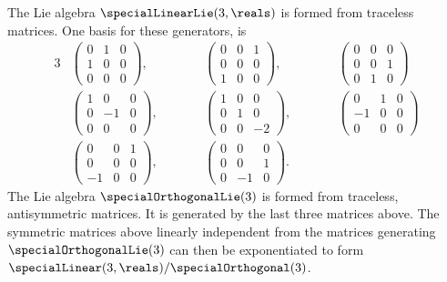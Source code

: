 \documentclass[fleqn]{NotesClass}
\begin{document}
\begin{exm}{}{}
        The Lie algebra \(\specialLinearLie(3, \reals)\) is formed from traceless matrices.
        One basis for these generators, is
        \begin{alignat}{3}
            &
            \begin{pmatrix}
                0 & 1 & 0\\
                1 & 0 & 0\\
                0 & 0 & 0
            \end{pmatrix}
            , \qquad &&
            \begin{pmatrix}
                0 & 0 & 1\\
                0 & 0 & 0\\
                1 & 0 & 0
            \end{pmatrix}
            , \qquad && 
            \begin{pmatrix}
                0 & 0 & 0\\
                0 & 0 & 1\\
                0 & 1 & 0
            \end{pmatrix}
            \\
            &
            \begin{pmatrix}
                1 & 0 & 0\\
                0 & -1 & 0\\
                0 & 0 & 0
            \end{pmatrix}
            , \qquad &&
            \begin{pmatrix}
                1 & 0 & 0\\
                0 & 1 & 0\\
                0 & 0 & -2
            \end{pmatrix}
            , \qquad &&
            \begin{pmatrix}
                0 & 1 & 0\\
                -1 & 0 & 0\\
                0 & 0 & 0
            \end{pmatrix}
            \\
            &
            \begin{pmatrix}
                0 & 0 & 1\\
                0 & 0 & 0\\
                -1 & 0 & 0
            \end{pmatrix}
            , \qquad &&
            \begin{pmatrix}
                0 & 0 & 0\\
                0 & 0 & 1\\
                0 & -1 & 0
            \end{pmatrix}
            .
        \end{alignat}
        The Lie algebra \(\specialOrthogonalLie(3)\) is formed from traceless, antisymmetric matrices.
        It is generated by the last three matrices above.
        The symmetric matrices above linearly independent from the matrices generating \(\specialOrthogonalLie(3)\) can then be exponentiated to form \(\specialLinear(3, \reals)/\specialOrthogonal(3)\).
    \end{exm}
\end{document}
